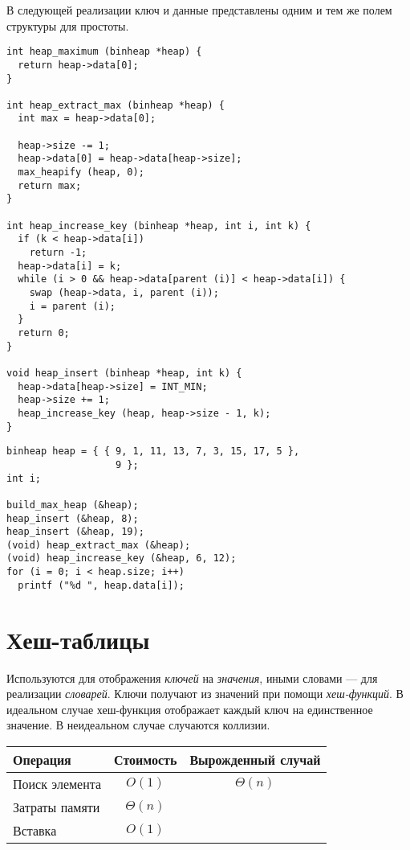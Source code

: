В следующей реализации ключ и данные представлены одним и тем же полем структуры для простоты.

\lstset{label=lst:pqueue-impl,caption=Некоторые операции}
\begin{lstlisting}
int heap_maximum (binheap *heap) {
  return heap->data[0];
}

int heap_extract_max (binheap *heap) {
  int max = heap->data[0];

  heap->size -= 1;
  heap->data[0] = heap->data[heap->size];
  max_heapify (heap, 0);
  return max;
}

int heap_increase_key (binheap *heap, int i, int k) {
  if (k < heap->data[i])
    return -1;
  heap->data[i] = k;
  while (i > 0 && heap->data[parent (i)] < heap->data[i]) {
    swap (heap->data, i, parent (i));
    i = parent (i);
  }
  return 0;
}

void heap_insert (binheap *heap, int k) {
  heap->data[heap->size] = INT_MIN;
  heap->size += 1;
  heap_increase_key (heap, heap->size - 1, k);
}
\end{lstlisting}

\lstset{label=lst:pqueue-usage,caption=Пример использования}
\begin{lstlisting}
binheap heap = { { 9, 1, 11, 13, 7, 3, 15, 17, 5 },
                   9 };
int i;

build_max_heap (&heap);
heap_insert (&heap, 8);
heap_insert (&heap, 19);
(void) heap_extract_max (&heap);
(void) heap_increase_key (&heap, 6, 12);
for (i = 0; i < heap.size; i++)
  printf ("%d ", heap.data[i]);
\end{lstlisting}

\section{Хеш-таблицы}
\label{sec:hash-tables}

Используются для отображения \emph{ключей} на \emph{значения}, иными словами --- для реализации \emph{словарей}. Ключи получают из значений при помощи \emph{хеш-функций}. В идеальном случае хеш-функция отображает каждый ключ на единственное значение. В неидеальном случае случаются коллизии.

\begin{center}
  \begin{tabular}{lcc}
    \toprule
    Операция & Стоимость & Вырожденный случай \\
    \midrule
    Поиск элемента & $O(1)$ & $\Theta(n)$ \\
    Затраты памяти & $\Theta(n)$ & \\
    Вставка & $O(1)$ & \\
    \bottomrule
  \end{tabular}
\end{center}

